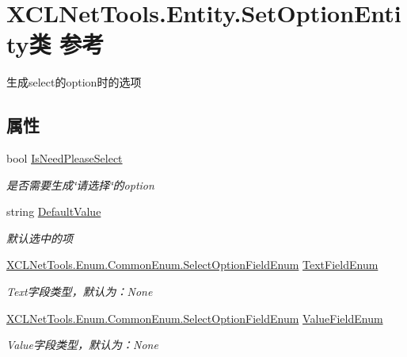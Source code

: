 \hypertarget{class_x_c_l_net_tools_1_1_entity_1_1_set_option_entity}{\section{X\-C\-L\-Net\-Tools.\-Entity.\-Set\-Option\-Entity类 参考}
\label{class_x_c_l_net_tools_1_1_entity_1_1_set_option_entity}
}


生成select的option时的选项  


\subsection*{属性}
\begin{DoxyCompactItemize}
\item 
bool \hyperlink{class_x_c_l_net_tools_1_1_entity_1_1_set_option_entity_a22c7d14f09183bb9124fa9219663be6c}{Is\-Need\-Please\-Select}
\begin{DoxyCompactList}\small\item\em 是否需要生成\char`\"{}请选择\char`\"{}的option \end{DoxyCompactList}\item 
string \hyperlink{class_x_c_l_net_tools_1_1_entity_1_1_set_option_entity_a504fe6ad96f52cb7eb9f8a4e64e07723}{Default\-Value}
\begin{DoxyCompactList}\small\item\em 默认选中的项 \end{DoxyCompactList}\item 
\hyperlink{class_x_c_l_net_tools_1_1_enum_1_1_common_enum_afe1323cff3b78e93907bf636697b2b59}{X\-C\-L\-Net\-Tools.\-Enum.\-Common\-Enum.\-Select\-Option\-Field\-Enum} \hyperlink{class_x_c_l_net_tools_1_1_entity_1_1_set_option_entity_a73ab171debc846e282a87565cf7baf96}{Text\-Field\-Enum}
\begin{DoxyCompactList}\small\item\em Text字段类型，默认为：\-None \end{DoxyCompactList}\item 
\hyperlink{class_x_c_l_net_tools_1_1_enum_1_1_common_enum_afe1323cff3b78e93907bf636697b2b59}{X\-C\-L\-Net\-Tools.\-Enum.\-Common\-Enum.\-Select\-Option\-Field\-Enum} \hyperlink{class_x_c_l_net_tools_1_1_entity_1_1_set_option_entity_a3f5eebe69ef0bc0e2c184f9d8d65fbaf}{Value\-Field\-Enum}
\begin{DoxyCompactList}\small\item\em Value字段类型，默认为：\-None \end{DoxyCompactList}\end{DoxyCompactItemize}


